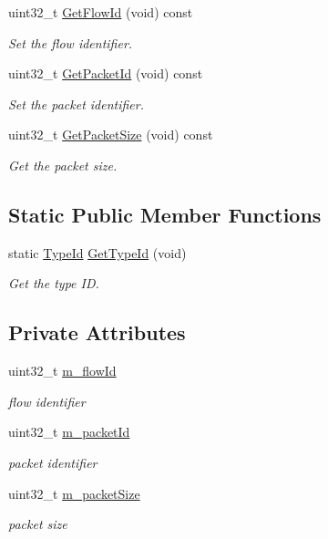 \begin{DoxyCompactItemize}
uint32\+\_\+t \hyperlink{classns3_1_1Ipv6FlowProbeTag_aa3e843cc05271d43dadadfba02605de0}{Get\+Flow\+Id} (void) const 
\begin{DoxyCompactList}\small\item\em Set the flow identifier. \end{DoxyCompactList}\item 
uint32\+\_\+t \hyperlink{classns3_1_1Ipv6FlowProbeTag_a2d6fb3cdf9e7bcd7809b8f50ea037711}{Get\+Packet\+Id} (void) const 
\begin{DoxyCompactList}\small\item\em Set the packet identifier. \end{DoxyCompactList}\item 
uint32\+\_\+t \hyperlink{classns3_1_1Ipv6FlowProbeTag_a621d97437a73348143d27a7e77f61c71}{Get\+Packet\+Size} (void) const 
\begin{DoxyCompactList}\small\item\em Get the packet size. \end{DoxyCompactList}\end{DoxyCompactItemize}
\subsection*{Static Public Member Functions}
\begin{DoxyCompactItemize}
\item 
static \hyperlink{classns3_1_1TypeId}{Type\+Id} \hyperlink{classns3_1_1Ipv6FlowProbeTag_acdc0d9e9e73b177b0f68e41a5a896d10}{Get\+Type\+Id} (void)
\begin{DoxyCompactList}\small\item\em Get the type ID. \end{DoxyCompactList}\end{DoxyCompactItemize}
\subsection*{Private Attributes}
\begin{DoxyCompactItemize}
\item 
uint32\+\_\+t \hyperlink{classns3_1_1Ipv6FlowProbeTag_a03d67f0cad6ed0dbc98dc8883309bc84}{m\+\_\+flow\+Id}
\begin{DoxyCompactList}\small\item\em flow identifier \end{DoxyCompactList}\item 
uint32\+\_\+t \hyperlink{classns3_1_1Ipv6FlowProbeTag_add2303a257d999c1f973ea07c17e58ad}{m\+\_\+packet\+Id}
\begin{DoxyCompactList}\small\item\em packet identifier \end{DoxyCompactList}\item 
uint32\+\_\+t \hyperlink{classns3_1_1Ipv6FlowProbeTag_ad7a05e0b3133454da69396acc7b7acbd}{m\+\_\+packet\+Size}
\begin{DoxyCompactList}\small\item\em packet size \end{DoxyCompactList}\end{DoxyCompactItemize}
